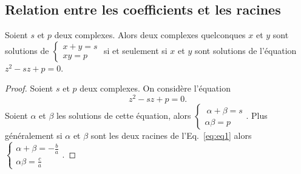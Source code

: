 \subsection{Relation entre les coefficients et les racines}
\label{subsec:relationcoefsracines}
%
\begin{prop}
  Soient $s$ et $p$ deux complexes. Alors deux complexes quelconques $x$ et $y$ sont solutions de $\begin{cases} x +y = s \\ xy=p \end{cases}$ si et seulement si $x$ et $y$ sont solutions de l'équation $z^2 -sz+p=0$.
\end{prop}
\begin{proof}
  Soient $s$ et $p$ deux complexes. On considère l'équation
  \begin{equation}
    z^2-sz+p=0.
  \end{equation}
  Soient $\alpha$ et $\beta$ les solutions de cette équation, alors
  $\begin{cases} \
    \alpha +\beta = s \\
    \alpha \beta=p
  \end{cases}$.
  Plus généralement si $\alpha$ et $\beta$ sont les deux racines de l'Eq.~\eqref{eq:eq1} alors $\begin{cases} \alpha + \beta = -\frac{b}{a} \\ \alpha \beta = \frac{c}{a} \end{cases}$.
\end{proof}
%
